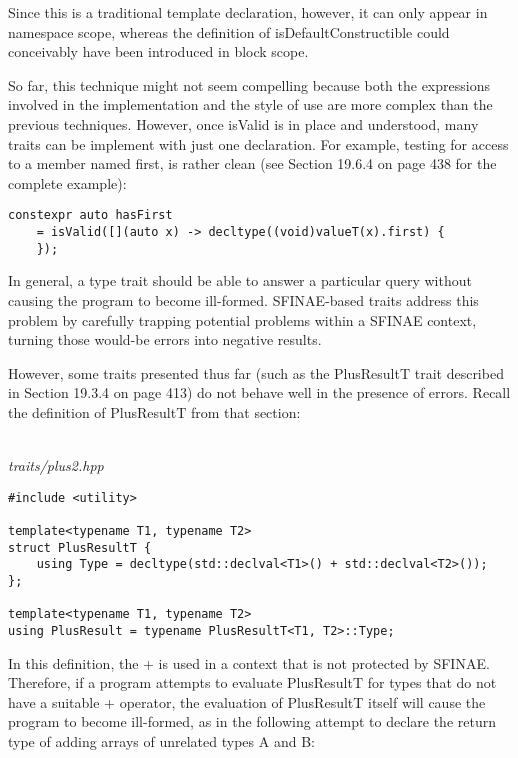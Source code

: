 Since this is a traditional template declaration, however, it can only appear in namespace scope, whereas the definition of isDefaultConstructible could conceivably have been introduced in block scope.

So far, this technique might not seem compelling because both the expressions involved in the implementation and the style of use are more complex than the previous techniques. However, once isValid is in place and understood, many traits can be implement with just one declaration. For example, testing for access to a member named first, is rather clean (see Section 19.6.4 on page 438 for the complete example):

\begin{lstlisting}[style=styleCXX]
constexpr auto hasFirst
	= isValid([](auto x) -> decltype((void)valueT(x).first) {
	});
\end{lstlisting}


In general, a type trait should be able to answer a particular query without causing the program to become ill-formed. SFINAE-based traits address this problem by carefully trapping potential problems within a SFINAE context, turning those would-be errors into negative results.

However, some traits presented thus far (such as the PlusResultT trait described in Section 19.3.4 on page 413) do not behave well in the presence of errors. Recall the definition of PlusResultT from that section:

\hspace*{\fill} \\ %
\noindent
\textit{traits/plus2.hpp}
\begin{lstlisting}[style=styleCXX]
#include <utility>

template<typename T1, typename T2>
struct PlusResultT {
	using Type = decltype(std::declval<T1>() + std::declval<T2>());
};

template<typename T1, typename T2>
using PlusResult = typename PlusResultT<T1, T2>::Type;
\end{lstlisting}

In this definition, the + is used in a context that is not protected by SFINAE. Therefore, if a program attempts to evaluate PlusResultT for types that do not have a suitable + operator, the evaluation of PlusResultT itself will cause the program to become ill-formed, as in the following attempt to declare the return type of adding arrays of unrelated types A and B:

